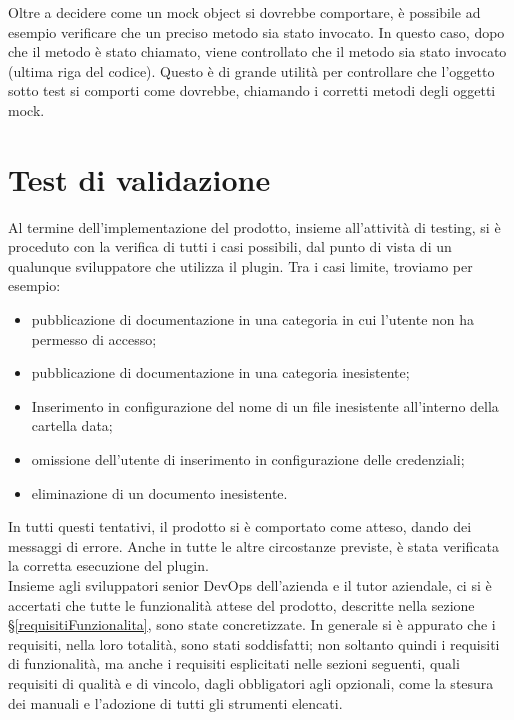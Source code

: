     Oltre a decidere come un mock object si dovrebbe comportare, è possibile ad esempio verificare che un preciso metodo sia stato invocato.
    In questo caso, dopo che il metodo  è stato chiamato, viene controllato che il metodo  sia stato invocato (ultima riga del codice).
    Questo è di grande utilità per controllare che l'oggetto sotto test si comporti come dovrebbe, chiamando i corretti metodi degli oggetti mock.


\section{Test di validazione}
Al termine dell'implementazione del prodotto, insieme all'attività di testing, si è proceduto con la verifica di tutti i casi possibili, dal punto di vista di un qualunque sviluppatore che utilizza il plugin.
Tra i casi limite, troviamo per esempio:
\begin{itemize}
    \item pubblicazione di documentazione in una categoria in cui l'utente non ha permesso di accesso;
    \item pubblicazione di documentazione in una categoria inesistente;
    \item Inserimento in configurazione del nome di un file inesistente all'interno della cartella data;
    \item omissione dell'utente di inserimento in configurazione delle credenziali;
    \item eliminazione di un documento inesistente.
\end{itemize}
In tutti questi tentativi, il prodotto si è comportato come atteso, dando dei messaggi di errore.
Anche in tutte le altre circostanze previste, è stata verificata la corretta esecuzione del plugin. \\

Insieme agli sviluppatori senior DevOps dell'azienda e il tutor aziendale, ci si è accertati che tutte le funzionalità attese del prodotto, descritte nella sezione \S\ref{requisitiFunzionalita}, sono state concretizzate.
In generale si è appurato che i requisiti, nella loro totalità, sono stati soddisfatti; non soltanto quindi i requisiti di funzionalità, ma anche i requisiti esplicitati nelle sezioni seguenti, quali requisiti di qualità e di vincolo, dagli obbligatori agli opzionali, come la stesura dei manuali e l'adozione di tutti gli strumenti elencati.


